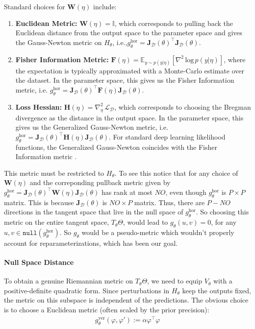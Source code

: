 Standard choices for $\mathbf{W}(\eta)$ include:
\begin{enumerate}
    \item \textbf{Euclidean Metric:} $\mathbf{W}
    (\eta) = \mathbb{I}$, which corresponds to pulling back the Euclidean distance from the output space to the parameter space and gives the Gauss-Newton metric on $H_\theta$, i.e.,$ g^{\mathrm{hor}}_\theta = \mathbf{J}_\mathcal{D}(\theta)^\top \mathbf{J}_\mathcal{D}(\theta)$.  
    \item \textbf{Fisher Information Metric:} $\mathbf{F}
    (\eta) = \mathbb{E}_{y\sim p(y|\eta)} [\nabla^2 \, \textrm{log}\, p(y|\eta)]$, where the expectation is typically approximated with a Monte-Carlo estimate over the dataset.  In the parameter space, this gives us the Fisher Information metric, i.e. $g^{\mathrm{hor}}_\theta = \mathbf{J}_\mathcal{D}(\theta)^\top \mathbf{F}
    (\eta)\mathbf{J}_\mathcal{D}(\theta)$.
    \item \textbf{Loss Hessian:} $\mathbf{H}
    (\eta) = \nabla^2_\eta \, \mathcal{L}_\mathcal{D}$, which corresponds to choosing the Bregman divergence as the distance in the output space. In the parameter space, this gives us the Generalized Gauss-Newton metric, i.e. $g^{\mathrm{hor}}_\theta = \mathbf{J}_\mathcal{D}(\theta)^\top \mathbf{H}
    (\eta)\mathbf{J}_\mathcal{D}(\theta)$. For standard deep learning likelihood functions, the Generalized Gauss-Newton coincides with the Fisher Information metric \citep{henning paper}.
\end{enumerate}
This metric must be restricted to $H_\theta$. To see this notice that for any choice of $\mathbf{W}(\eta)$ and the correponding pullback metric given by $g^{\mathrm{hor}}_\theta = \mathbf{J}_\mathcal{D}(\theta)^\top \mathbf{W}(\eta)\mathbf{J}_\mathcal{D}(\theta)$ has rank at most $NO$, even though $g^{\mathrm{hor}}_\theta$ is $P\times P$ matrix. This is because $\mathbf{J}_\mathcal{D}(\theta)$ is $NO \times P$ matrix. Thus, there are $P - NO$ directions in the tangent space that live in the null space of $g^{\mathrm{hor}}_\theta$. So choosing this metric on the entire tangent space, $T_\theta \Theta$, would lead to $g_\theta(u, v) = 0$, for any $u,v \in \texttt{null}(g^{\mathrm{hor}}_\theta)$. So $g_\theta$ would be a pseudo-metric which wouldn't properly account for reparameterizations, which has been our goal. 

\paragraph{Null Space Distance}
 To obtain a genuine Riemannian metric on $T_\theta\Theta$, we need to equip $V_\theta$ with a positive-definite quadratic form. Since perturbations in $H_\theta$ keep the outputs fixed, the metric on this subspace is independent of the predictions. The obvious choice is to choose a Euclidean metric (often scaled by the prior precision):
 \begin{align}
     g^{\mathrm{ver}}_\theta(\varphi,\varphi') := \alpha \varphi^\top \varphi
 \end{align}
 
